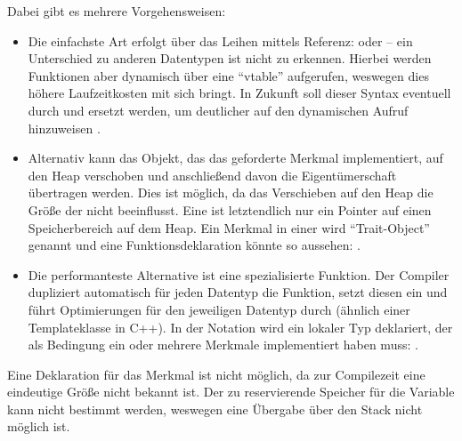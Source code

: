 Dabei gibt es mehrere Vorgehensweisen:
\begin{itemize}
	\item Die einfachste Art erfolgt über das Leihen mittels Referenz:  oder  -- ein Unterschied zu anderen Datentypen ist nicht zu erkennen.
	Hierbei werden Funktionen aber dynamisch über eine \enquote{vtable} aufgerufen, weswegen dies höhere Laufzeitkosten mit sich bringt.
	In Zukunft soll dieser Syntax eventuell durch  und  ersetzt werden, um deutlicher auf den dynamischen Aufruf hinzuweisen \cite{rust:github:dyn}.
	
	\item Alternativ kann das Objekt, das das geforderte Merkmal implementiert, auf den Heap verschoben und anschließend davon die Eigentümerschaft übertragen werden.
	Dies ist möglich, da das Verschieben auf den Heap die Größe der  nicht beeinflusst.
	Eine  ist letztendlich nur ein Pointer auf einen Speicherbereich auf dem Heap.
	Ein Merkmal in einer  wird \enquote{Trait-Object} genannt und eine Funktionsdeklaration könnte so aussehen: .
	
	\item Die performanteste Alternative ist eine spezialisierte Funktion.
	Der Compiler dupliziert automatisch für jeden Datentyp die Funktion, setzt diesen ein und führt Optimierungen für den jeweiligen Datentyp durch (ähnlich einer Templateklasse in C++).
	In der Notation wird ein lokaler Typ deklariert, der als Bedingung ein oder mehrere Merkmale implementiert haben muss: .
\end{itemize}

Eine Deklaration  für das Merkmal  ist nicht möglich, da zur Compilezeit eine eindeutige Größe nicht bekannt ist.
Der zu reservierende Speicher für die Variable kann nicht bestimmt werden, weswegen eine Übergabe über den Stack nicht möglich ist.



